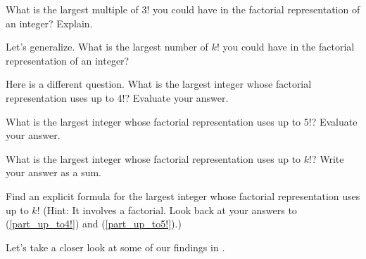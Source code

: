 \begin{act}
\begin{actpart}
        \item What is the largest multiple of 3! you could have in the factorial representation of an integer? Explain. 

        \item Let's generalize.  What is the largest number of $k!$ you could have in the factorial representation of an integer?

        \item \label{part_up_to4!} Here is a different question. What is the largest integer whose factorial representation uses up to 4!? Evaluate your answer.

        \item \label{part_up_to5!} What is the largest integer whose factorial representation uses up to 5!? Evaluate your answer.

        \item What is the largest integer whose factorial representation uses up to $k!$?  Write your answer as a sum. 

        \item Find an explicit formula for the largest integer whose factorial representation uses up to $k!$  (Hint:  It involves a factorial. Look back at your answers to (\ref{part_up_to4!}) and (\ref{part_up_to5!}).) 
    \end{actpart}
\end{act}

Let's take a closer look at some of our findings in . 

